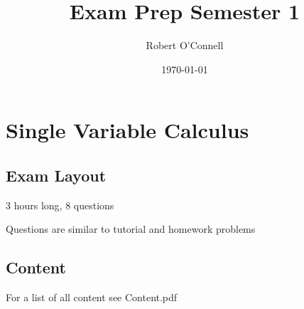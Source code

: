 \documentclass{article}
\title{\textbf{Exam Prep Semester 1}}
\author{Robert O'Connell}
\date{\today}
\begin{document}
\maketitle
\section*{Single Variable Calculus}
\subsection*{Exam Layout}
3 hours long, 8 questions

Questions are similar to tutorial and homework problems

\subsection*{Content}
For a list of all content see Content.pdf
\end{document}
